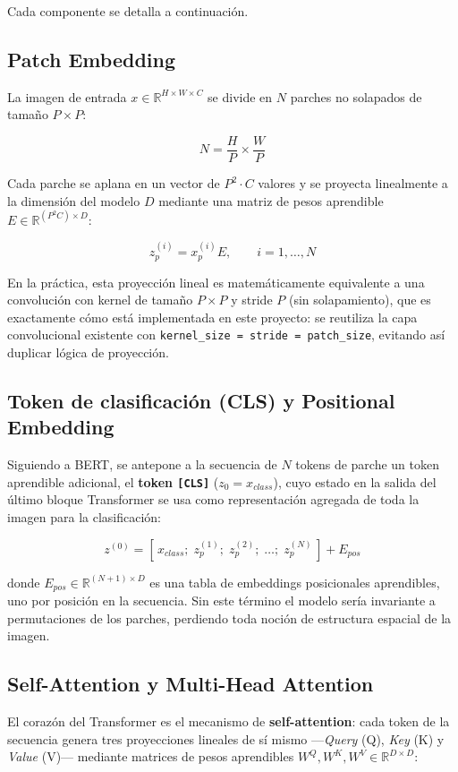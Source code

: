 \documentclass[11pt,a4paper]{article}
\begin{document}
Cada componente se detalla a continuación.

\subsection{Patch Embedding}

La imagen de entrada $x \in \mathbb{R}^{H \times W \times C}$ se divide en
$N$ parches no solapados de tamaño $P \times P$:

\[
N = \frac{H}{P} \times \frac{W}{P}
\]

Cada parche se aplana en un vector de $P^2 \cdot C$ valores y se proyecta
linealmente a la dimensión del modelo $D$ mediante una matriz de pesos
aprendible $E \in \mathbb{R}^{(P^2 C) \times D}$:

\[
z_p^{(i)} = x_p^{(i)} E, \qquad i = 1, \dots, N
\]

En la práctica, esta proyección lineal es matemáticamente equivalente a una
convolución con kernel de tamaño $P \times P$ y stride $P$ (sin
solapamiento), que es exactamente cómo está implementada en este proyecto:
se reutiliza la capa convolucional existente con
\texttt{kernel\_size = stride = patch\_size}, evitando así duplicar lógica
de proyección.

\subsection{Token de clasificación (CLS) y Positional Embedding}
\label{sec:cls-pos}

Siguiendo a BERT, se antepone a la secuencia de $N$ tokens de parche un
token aprendible adicional, el \textbf{token \texttt{[CLS]}}
($z_0 = x_{class}$), cuyo estado en la salida del último bloque Transformer
se usa como representación agregada de toda la imagen para la
clasificación:

\[
z^{(0)} = [\,x_{class};\; z_p^{(1)};\; z_p^{(2)};\; \dots;\; z_p^{(N)}\,] + E_{pos}
\]

donde $E_{pos} \in \mathbb{R}^{(N+1) \times D}$ es una tabla de embeddings
posicionales aprendibles, uno por posición en la secuencia. Sin este término
el modelo sería invariante a permutaciones de los parches, perdiendo toda
noción de estructura espacial de la imagen.

\subsection{Self-Attention y Multi-Head Attention}

El corazón del Transformer es el mecanismo de \textbf{self-attention}: cada
token de la secuencia genera tres proyecciones lineales de sí mismo
---\emph{Query} (Q), \emph{Key} (K) y \emph{Value} (V)--- mediante matrices
de pesos aprendibles $W^Q, W^K, W^V \in \mathbb{R}^{D \times D}$:
\end{document}
